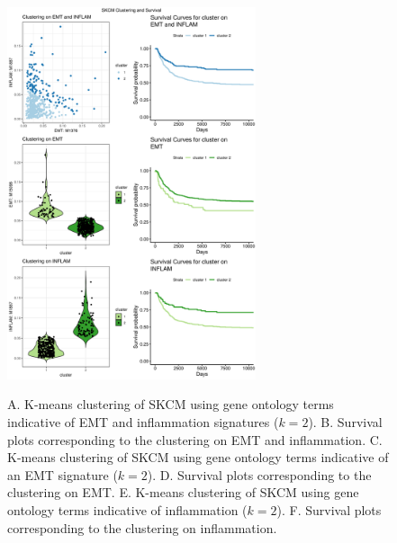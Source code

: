 \documentclass[11pt, a4paper, preprint]{article}
\begin{document}
\begin{figure}
\center
{\includegraphics[width=0.65\textwidth]{../Figs/Figure6/SKCM.pdf}}
\caption{A. K-means clustering of SKCM using gene ontology terms indicative of EMT and inflammation signatures ($k=2$).
B. Survival plots corresponding to the clustering on EMT and inflammation.
C. K-means clustering of SKCM using gene ontology terms indicative of an EMT signature ($k=2$).
D. Survival plots corresponding to the clustering on EMT.
E. K-means clustering of SKCM using gene ontology terms indicative of inflammation ($k=2$).
F. Survival plots corresponding to the clustering on inflammation.}
\label{fig:SKCM}
\end{figure}
\end{document}

